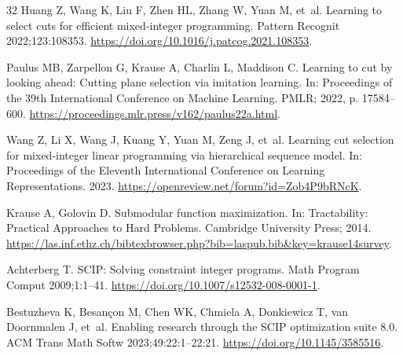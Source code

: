 \documentclass[final,5p,times,twocolumn]{elsarticle}
\begin{document}
\begin{thebibliography}{32}
Huang Z, Wang K, Liu F, Zhen HL, Zhang W, Yuan M, et~al. Learning to select cuts for efficient mixed-integer programming.
Pattern Recognit 2022;123:108353.
\url{https://doi.org/10.1016/j.patcog.2021.108353}.

Paulus MB, Zarpellon G, Krause A, Charlin L, Maddison C. Learning to cut by looking ahead: Cutting plane selection via imitation learning.
In: Proceedings of the 39th International Conference on Machine Learning. PMLR; 2022, p. 17584--600.
\url{https://proceedings.mlr.press/v162/paulus22a.html}.

Wang Z, Li X, Wang J, Kuang Y, Yuan M, Zeng J, et~al. Learning cut selection for mixed-integer linear programming via hierarchical sequence model.
In: Proceedings of the Eleventh International Conference on Learning Representations. 2023.
\url{https://openreview.net/forum?id=Zob4P9bRNcK}.

Krause A, Golovin D. Submodular function maximization.
In: Tractability: Practical Approaches to Hard Problems. Cambridge University Press; 2014.
\url{https://las.inf.ethz.ch/bibtexbrowser.php?bib=laspub.bib\&key=krause14survey}.

Achterberg T. {SCIP}: Solving constraint integer programs.
Math Program Comput 2009;1:1--41.
\url{https://doi.org/10.1007/s12532-008-0001-1}.

Bestuzheva K, Besan{\c{c}}on M, Chen WK, Chmiela A, Donkiewicz T, van Doornmalen J, et~al. Enabling research through the {SCIP} optimization suite 8.0.
ACM Trans Math Softw 2023;49:22:1--22:21.
\url{https://doi.org/10.1145/3585516}.

\end{thebibliography}
\end{document}
